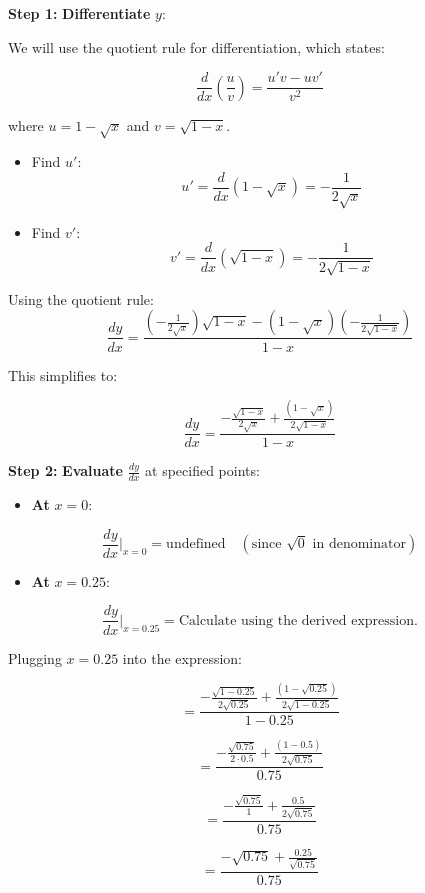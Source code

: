 \documentclass[
]{book}
\providecommand{\tightlist}{%
  \setlength{\itemsep}{0pt}\setlength{\parskip}{0pt}}
\begin{document}
\textbf{Step 1:} \textbf{Differentiate} \(y\):

We will use the quotient rule for differentiation, which states:

\[
\frac{d}{dx}\left(\frac{u}{v}\right) = \frac{u'v - uv'}{v^2}
\]

where \(u = 1 - \sqrt{x}\) and \(v = \sqrt{1 - x}\).

\begin{itemize}
\item
  Find \(u'\): \[
  u' = \frac{d}{dx}(1 - \sqrt{x}) = -\frac{1}{2\sqrt{x}}
  \]
\item
  Find \(v'\): \[
  v' = \frac{d}{dx}(\sqrt{1 - x}) = -\frac{1}{2\sqrt{1 - x}}
  \]
\end{itemize}

Using the quotient rule: \[
\frac{dy}{dx} = \frac{\left(-\frac{1}{2\sqrt{x}}\right) \sqrt{1 - x} - (1 - \sqrt{x}) \left(-\frac{1}{2\sqrt{1 - x}}\right)}{1 - x}
\]

This simplifies to:

\[
\frac{dy}{dx} = \frac{-\frac{\sqrt{1 - x}}{2\sqrt{x}} + \frac{(1 - \sqrt{x})}{2\sqrt{1 - x}}}{1 - x}
\]

\textbf{Step 2:} \textbf{Evaluate} \(\frac{dy}{dx}\) at specified
points:

\begin{itemize}
\tightlist
\item
  \textbf{At} \(x = 0\):
\end{itemize}

\[
    \frac{dy}{dx}\bigg|_{x=0} = \text{undefined} \quad (\text{since } \sqrt{0} \text{ in denominator})
\]

\begin{itemize}
\tightlist
\item
  \textbf{At} \(x = 0.25\):
\end{itemize}

\[
    \frac{dy}{dx}\bigg|_{x=0.25} = \text{Calculate using the derived expression.}
\]

Plugging \(x = 0.25\) into the expression:

\[
    = \frac{-\frac{\sqrt{1 - 0.25}}{2\sqrt{0.25}} + \frac{(1 - \sqrt{0.25})}{2\sqrt{1 - 0.25}}}{1 - 0.25}
\]

\[
    = \frac{-\frac{\sqrt{0.75}}{2 \cdot 0.5} + \frac{(1 - 0.5)}{2\sqrt{0.75}}}{0.75}
\]

\[
    = \frac{-\frac{\sqrt{0.75}}{1} + \frac{0.5}{2\sqrt{0.75}}}{0.75}
\]

\[
    = \frac{-\sqrt{0.75} + \frac{0.25}{\sqrt{0.75}}}{0.75}
\]
\end{document}
